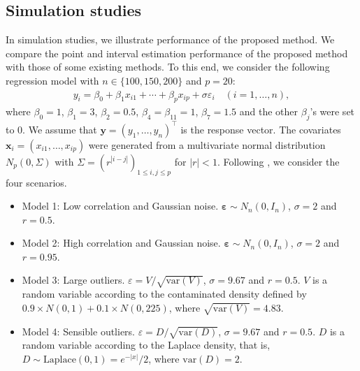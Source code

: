 \documentclass[11pt]{article}
\theoremstyle{plain}
\theoremstyle{definition}
\begin{document}
\subsection{Simulation studies}
\label{subsec:4.3}

In simulation studies, we illustrate performance of the proposed method. 
We compare the point and interval estimation performance of the proposed method with those of some existing methods.
To this end, we consider the following regression model with $n \in \{100, 150, 200\}$ and $p=20$:
\begin{align*}
y_i=\beta_0 + \beta_1x_{i1}+\cdots+\beta_px_{ip}+\sigma \varepsilon_i  \quad  (i=1,\ldots,n),
\end{align*}
where $\beta_0=1$, $\beta_1=3$,  $\beta_2=0.5$, $\beta_4=\beta_{11}=1$, $\beta_7=1.5$ and the other $\beta_j$'s were set to $0$. We assume that $\bm{y}=(y_1,\dots,y_n)^{\top}$ is the response vector. 
The covariates $\bm{x}_i=(x_{i1},\ldots,x_{ip})$ were generated from a multivariate normal distribution $N_p(0,\Sigma)$ with $\Sigma=(r^{|i-j|})_{1\leq i,j\leq p}$ for $|r|<1$. Following \cite{LZ11}, we consider the four scenarios.
\begin{itemize}
\item Model 1: Low correlation and Gaussian noise. $\bm{\varepsilon}\sim N_n(0,I_n)$, $\sigma=2$ and $r=0.5$.
\item Model 2: High correlation and Gaussian noise. $\bm{\varepsilon}\sim N_n(0,I_n)$, $\sigma=2$ and $r=0.95$.
\item Model 3: Large outliers. $\varepsilon=V/\sqrt{\mathrm{var}(V)}$, $\sigma=9.67$ and $r=0.5$. $V$ is a random variable according to the contaminated density defined by $0.9 \times N(0,1) + 0.1 \times N(0,225)$, where $\sqrt{\mathrm{var}(V)}=4.83$. 
\item Model 4: Sensible outliers. $\varepsilon=D/\sqrt{\mathrm{var}(D)}$, $\sigma=9.67$ and $r=0.5$. $D$ is a random variable according to the Laplace density, that is, $D\sim \mathrm{Laplace}(0,1)=e^{-|x|}/2$, where $\mathrm{var}(D)=2$.
\end{itemize}
\end{document}
